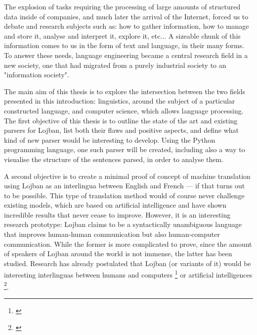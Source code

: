 The explosion of tasks requiring the processing of large amounts of structured data inside of companies, and much later the arrival of the Internet, forced us to debate and
research subjects such as: how to gather information, how to manage and store it, analyse and interpret it, explore it, etc... A sizeable chunk of this information comes to us
in the form of text and language, in their many forms. To answer these needs, language engineering became a central research field in a new society, one that had migrated
from a purely industrial society to an "information society".\newline

The main aim of this thesis is to explore the intersection between the two fields presented in this introduction: linguistics, around the subject of a particular constructed
language, and computer science, which allows language processing. The first objective of this thesis is to outline the state of the art and existing parsers for Lojban, list both
their flaws and positive aspects, and define what kind of new parser would be interesting to develop. Using the Python programming language, one such parser will be created, including
also a way to visualise the structure of the sentences parsed, in order to analyse them.\newline

A second objective is to create a minimal proof of concept of machine translation using Lojban as an interlingua between English and French --- if that turns out to be possible.
This type of translation method would of course never challenge existing models, which are based on artificial intelligence and have shown incredible results that never cease to
improve. However, it is an interesting research prototype: Lojban claims to be a syntactically unambiguous language that improves human-human communication but also human-computer
communication. While the former is more complicated to prove, since the amount of speakers of Lojban around the world is not immense, the latter has been studied. Research has already
postulated that Lojban (or variants of it) would be interesting interlinguas between humans and computers \footnote{\cite{speer2004meeting}} or artificial
intelligences \footnote{\cite{goertzel2013lojban}}.
